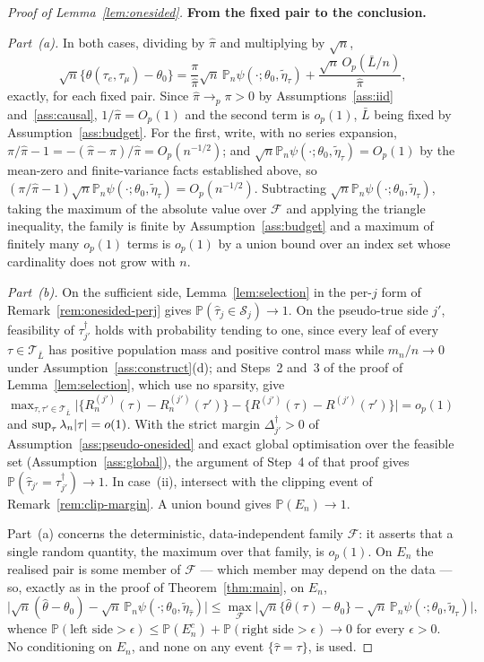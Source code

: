 \documentclass[11pt]{article}
\theoremstyle{plain}
\theoremstyle{definition}
\theoremstyle{remark}
\newcommand{\PP}{\mathbb{P}}
\newcommand{\Pn}{\mathbb{P}_n}
\newcommand{\cT}{\mathcal{T}}
\newcommand{\cS}{\mathcal{S}}
\newcommand{\that}{\widehat{\tau}}
\newcommand{\thetahat}{\widehat{\theta}}
\newcommand{\pihat}{\widehat{\pi}}
\DeclarePairedDelimiter{\card}{\lvert}{\rvert}
\newcommand{\etatil}{\widetilde{\eta}}
\newcommand{\cF}{\mathcal{F}}
\begin{document}
\begin{proof}[Proof of Lemma~\ref{lem:onesided}]
\medskip
\noindent\textbf{From the fixed pair to the conclusion.}

\emph{Part~(a).} In both cases, dividing by $\pihat$ and multiplying by
$\sqrt n$,
\[
  \sqrt n\{\thetahat(\tau_e,\tau_\mu)-\theta_0\}
  =\frac\pi{\pihat}\sqrt n\,\Pn\psi(\cdot;\theta_0,\etatil_\tau)
   +\frac{\sqrt n\,O_p(\bar L/n)}{\pihat},
\]
exactly, for each fixed pair. Since $\pihat\to_p\pi>0$ by
Assumptions~\ref{ass:iid} and~\ref{ass:causal}, $1/\pihat=O_p(1)$ and the second
term is $o_p(1)$, $\bar L$ being fixed by Assumption~\ref{ass:budget}. For the
first, write, with no series expansion, $\pi/\pihat-1=-(\pihat-\pi)/\pihat
=O_p(n^{-1/2})$; and $\sqrt n\Pn\psi(\cdot;\theta_0,\etatil_\tau)=O_p(1)$ by the
mean-zero and finite-variance facts established above, so
$(\pi/\pihat-1)\sqrt n\Pn\psi(\cdot;\theta_0,\etatil_\tau)=O_p(n^{-1/2})$.
Subtracting $\sqrt n\Pn\psi(\cdot;\theta_0,\etatil_\tau)$, taking the maximum of
the absolute value over $\cF$ and applying the triangle inequality, the family
is finite by Assumption~\ref{ass:budget} and a maximum of finitely many $o_p(1)$
terms is $o_p(1)$ by a union bound over an index set whose cardinality does not
grow with $n$.

\emph{Part~(b).} On the sufficient side, Lemma~\ref{lem:selection} in the
per-$j$ form of Remark~\ref{rem:onesided-perj} gives
$\PP(\that_j\in\cS_j)\to1$. On the pseudo-true side $j'$, feasibility of
$\tau^\dagger_{j'}$ holds with probability tending to one, since every leaf of
every $\tau\in\cT_{\bar L}$ has positive population mass and positive control
mass while $m_n/n\to0$ under Assumption~\ref{ass:construct}(d); and Steps~2
and~3 of the proof of Lemma~\ref{lem:selection}, which use no sparsity, give
$\max_{\tau,\tau'\in\cT_{\bar L}}\lvert\{R^{(j')}_n(\tau)-R^{(j')}_n(\tau')\}
-\{R^{(j')}(\tau)-R^{(j')}(\tau')\}\rvert=o_p(1)$ and
$\sup_\tau\lambda_n\card\tau=o(1)$. With the strict margin
$\Delta^\dagger_{j'}>0$ of Assumption~\ref{ass:pseudo-onesided} and exact global
optimisation over the feasible set (Assumption~\ref{ass:global}), the argument
of Step~4 of that proof gives
$\PP(\that_{j'}=\tau^\dagger_{j'})\to1$. In case~(ii), intersect with the
clipping event of Remark~\ref{rem:clip-margin}. A union bound gives
$\PP(E_n)\to1$.

Part~(a) concerns the deterministic, data-independent family $\cF$: it asserts
that a single random quantity, the maximum over that family, is $o_p(1)$. On
$E_n$ the realised pair is some member of $\cF$ --- which member may depend on
the data --- so, exactly as in the proof of Theorem~\ref{thm:main}, on $E_n$,
\[
  \bigl\lvert\sqrt n(\thetahat-\theta_0)
   -\sqrt n\,\Pn\psi(\cdot;\theta_0,\etatil_{\that})\bigr\rvert
  \le\max_{\cF}\bigl\lvert\sqrt n\{\thetahat(\tau)-\theta_0\}
   -\sqrt n\,\Pn\psi(\cdot;\theta_0,\etatil_\tau)\bigr\rvert ,
\]
whence $\PP(\text{left side}>\epsilon)\le\PP(E^c_n)
+\PP(\text{right side}>\epsilon)\to0$ for every $\epsilon>0$. No conditioning on
$E_n$, and none on any event $\{\that=\tau\}$, is used.


\end{proof}
\end{document}
